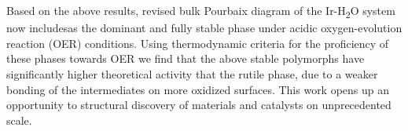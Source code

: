 %
Based on the above results, revised  bulk Pourbaix diagram of the Ir-H\textsubscript{2}O system now includes\IrOthree as the dominant and fully stable phase under acidic oxygen-evolution reaction (OER) conditions.
Using thermodynamic criteria for the proficiency of these phases towards OER we find that the above stable \IrOthree polymorphs have significantly higher theoretical activity that the rutile \IrOtwo phase, due to a weaker bonding of the intermediates on more oxidized \IrOthree surfaces. 
This work opens up an opportunity to structural discovery of materials and catalysts on unprecedented scale.
